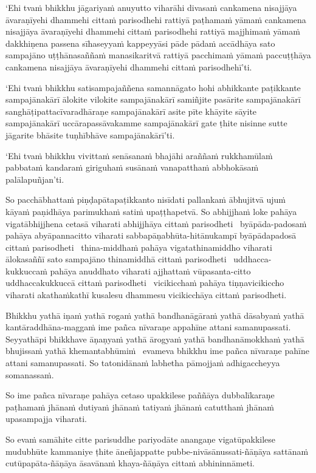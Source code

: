 ‘Ehi tvaṁ bhikkhu jāgariyaṁ anuyutto viharāhi divasaṁ cankamena nisajjāya āvaraṇīyehi dhammehi cittaṁ parisodhehi rattiyā paṭhamaṁ yāmaṁ cankamena nisajjāya āvaraṇīyehi dhammehi cittaṁ parisodhehi rattiyā majjhimaṁ yāmaṁ dakkhiṇena passena sīhaseyyaṁ kappeyyāsi pāde pādaṁ accādhāya sato sampajāno uṭṭhānasaññaṁ manasikaritvā rattiyā pacchimaṁ yāmaṁ paccuṭṭhāya cankamena nisajjāya āvaraṇīyehi dhammehi cittaṁ parisodhehī’ti.

‘Ehi tvaṁ bhikkhu satisampajaññena samannāgato hohi abhikkante paṭikkante sampajānakārī ālokite vilokite sampajānakārī samiñjite pasārite sampajānakārī sanghāṭipattacīvaradhāraṇe sampajānakārī asite pīte khāyite sāyite sampajānakārī uccārapassāvakamme sampajānakārī gate ṭhite nisinne sutte jāgarite bhāsite tuṇhībhāve sampajānakārī’ti.

‘Ehi tvaṁ bhikkhu vivittaṁ senāsanaṁ bhajāhi araññaṁ rukkhamūlaṁ pabbataṁ kandaraṁ giriguhaṁ susānaṁ vanapatthaṁ abbhokāsaṁ palālapuñjan’ti.

So pacchābhattaṁ piṇḍapātapaṭikkanto nisīdati pallankaṁ ābhujitvā ujuṁ kāyaṁ paṇidhāya parimukhaṁ satiṁ upaṭṭhapetvā. So abhijjhaṁ loke pahāya vigatābhijjhena cetasā viharati abhijjhāya cittaṁ parisodheti \breathmark\ byāpāda-padosaṁ pahāya abyāpannacitto viharati sabbapāṇabhūta-hitānukampī byāpādapadosā cittaṁ parisodheti \breathmark\ thina-middhaṁ pahāya vigatathinamiddho viharati ālokasaññī sato sampajāno thinamiddhā cittaṁ parisodheti \breathmark\ uddhacca-kukkuccaṁ pahāya anuddhato viharati ajjhattaṁ vūpasanta-citto uddhaccakukkuccā cittaṁ parisodheti \breathmark\ vicikicchaṁ pahāya tiṇṇavicikiccho viharati akathaṁkathī kusalesu dhammesu vicikicchāya cittaṁ parisodheti.

\suttaRef{[MN 107]}

Bhikkhu yathā iṇaṁ yathā rogaṁ yathā bandhanāgāraṁ yathā dāsabyaṁ yathā kantāraddhāna-maggaṁ ime pañca nīvaraṇe appahīne attani samanupassati. Seyyathāpi bhikkhave āṇaṇyaṁ yathā ārogyaṁ yathā bandhanāmokkhaṁ yathā bhujissaṁ yathā khemantabhūmiṁ \breathmark\ evameva bhikkhu ime pañca nīvaraṇe pahīne attani samanupassati. So tatonidānaṁ labhetha pāmojjaṁ adhigaccheyya somanassaṁ.

So ime pañca nīvaraṇe pahāya cetaso upakkilese paññāya dubbalīkaraṇe paṭhamaṁ jhānaṁ dutiyaṁ jhānaṁ tatiyaṁ jhānaṁ catutthaṁ jhānaṁ upasampajja viharati.

So evaṁ samāhite citte parisuddhe pariyodāte anangaṇe vigatūpakkilese mudubhūte kammaniye ṭhite āneñjappatte pubbe-nivāsānussati-ñāṇāya sattānaṁ cutūpapāta-ñāṇāya āsavānaṁ khaya-ñāṇāya cittaṁ abhininnāmeti.

